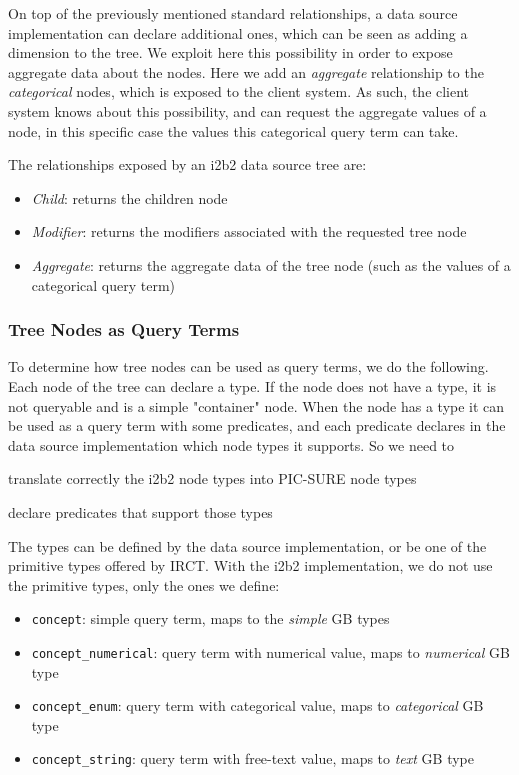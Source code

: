 On top of the previously mentioned standard relationships, a data source implementation can declare additional ones, which can be seen as adding a dimension to the tree.
We exploit here this possibility in order to expose aggregate data about the nodes.
Here we add an \emph{aggregate} relationship to the \emph{categorical} nodes, which is exposed to the client system.
As such, the client system knows about this possibility, and can request the aggregate values of a node, in this specific case the values this categorical query term can take.

The relationships exposed by an i2b2 data source tree are:
\begin{itemize}
    \item \emph{Child}: returns the children node 
    \item \emph{Modifier}: returns the modifiers associated with the requested tree node
    \item \emph{Aggregate}: returns the aggregate data of the tree node (such as the values of a categorical query term)
\end{itemize}


\subsubsection{Tree Nodes as Query Terms}

To determine how tree nodes can be used as query terms, we do the following.
Each node of the tree can declare a type. 
If the node does not have a type, it is not queryable and is a simple "container" node.
When the node has a type it can be used as a query term with some predicates, and each predicate declares in the data source implementation which node types it supports.
So we need to 
\begin{enumerate*}
    \item translate correctly the i2b2 node types into PIC-SURE node types
    \item declare predicates that support those types
\end{enumerate*}

The types can be defined by the data source implementation, or be one of the primitive types offered by IRCT.
With the i2b2 implementation, we do not use the primitive types, only the ones we define:
\begin{samepage}
\begin{itemize}
    \item \verb|concept|: simple query term, maps to the \emph{simple} GB types
    \item \verb|concept_numerical|: query term with numerical value, maps to \emph{numerical} GB type
    \item \verb|concept_enum|: query term with categorical value, maps to \emph{categorical} GB type
    \item \verb|concept_string|: query term with free-text value, maps to \emph{text} GB type
\end{itemize}
\end{samepage}


